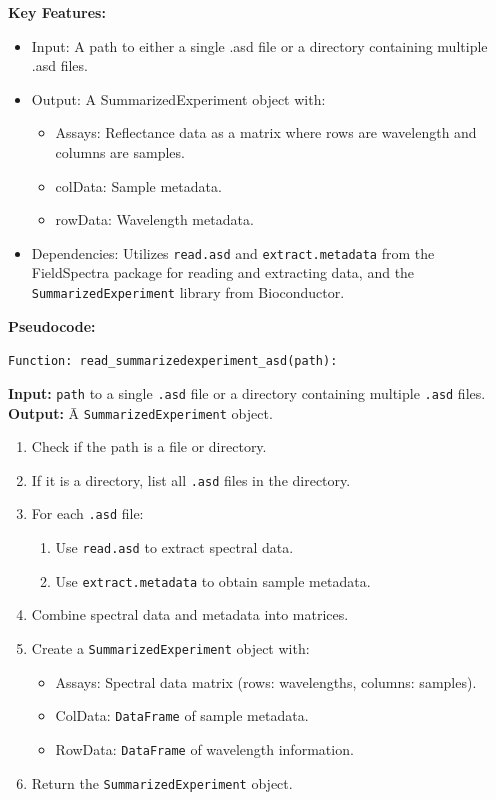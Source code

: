 \documentclass[12pt,a4paper]{report}
\begin{document}
\textbf{Key Features:}
\begin{itemize}
    \item Input: A path to either a single .asd file or a directory containing multiple .asd files.
    \item Output: A SummarizedExperiment object with: 
    \begin{itemize}
        \item Assays: Reflectance data as a matrix where rows are wavelength and columns are samples.
        \item colData: Sample metadata.
        \item rowData: Wavelength metadata.
    \end{itemize}
    \item Dependencies: Utilizes \texttt{read.asd} and \texttt{extract.metadata} from the FieldSpectra package for reading and extracting data, and the \texttt{SummarizedExperiment} library from Bioconductor.
\end{itemize}

\textbf{Pseudocode:} 

\texttt{Function: read\_summarizedexperiment\_asd(path):} \\

\begin{tabbing}
\hspace*{2em} \textbf{Input:} \= \texttt{path} to a single \texttt{.asd} file or a directory containing multiple \texttt{.asd} files. \\
\hspace*{2em} \textbf{Output:} \= A \texttt{SummarizedExperiment} object.
\end{tabbing}



\begin{enumerate}
    \item Check if the path is a file or directory.
    \item If it is a directory, list all \texttt{.asd} files in the directory.
    \item For each \texttt{.asd} file:
    \begin{enumerate}
        \item Use \texttt{read.asd} to extract spectral data.
        \item Use \texttt{extract.metadata} to obtain sample metadata.
    \end{enumerate}
    \item Combine spectral data and metadata into matrices.
    \item Create a \texttt{SummarizedExperiment} object with:
    \begin{itemize}
        \item Assays: Spectral data matrix (rows: wavelengths, columns: samples).
        \item ColData: \texttt{DataFrame} of sample metadata.
        \item RowData: \texttt{DataFrame} of wavelength information.
    \end{itemize}
    \item Return the \texttt{SummarizedExperiment} object.
\end{enumerate}
\end{document}
